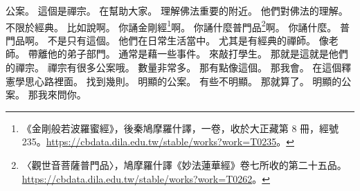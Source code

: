 \hypertarget{c01:cue:203}{}公案。
\hypertarget{c01:cue:204}{}這個是禪宗。
\hypertarget{c01:cue:205}{}在幫助大家。
\hypertarget{c01:cue:206}{}理解佛法重要的附近。
\hypertarget{c01:cue:207}{}他們對佛法的理解。
\hypertarget{c01:cue:208}{}不限於經典。
\hypertarget{c01:cue:209}{}比如說啊。
\hypertarget{c01:cue:210}{}你誦金剛經\footnote{《金剛般若波羅蜜經》，後秦鳩摩羅什譯，一卷，收於大正藏第 8 冊，經號 235。\url{https://cbdata.dila.edu.tw/stable/works?work=T0235}。}啊。
\hypertarget{c01:cue:211}{}你誦什麼普門品\footnote{〈觀世音菩薩普門品〉，鳩摩羅什譯《妙法蓮華經》卷七所收的第二十五品。\url{https://cbdata.dila.edu.tw/stable/works?work=T0262}。}啊。
\hypertarget{c01:cue:212}{}你誦什麼。
\hypertarget{c01:cue:213}{}普門品啊。
\hypertarget{c01:cue:214}{}不是只有這個。
\hypertarget{c01:cue:215}{}他們在日常生活當中。
\hypertarget{c01:cue:216}{}尤其是有經典的禪師。
\hypertarget{c01:cue:217}{}像老師。
\hypertarget{c01:cue:218}{}帶離他的弟子部門。
\hypertarget{c01:cue:219}{}通常是藉一些事件。
\hypertarget{c01:cue:220}{}來敲打學生。
\hypertarget{c01:cue:221}{}那就是這就是他們的禪宗。
\hypertarget{c01:cue:222}{}禪宗有很多公案哦。
\hypertarget{c01:cue:223}{}數量非常多。
\hypertarget{c01:cue:224}{}那有點像這個。
\hypertarget{c01:cue:225}{}那我會。
\hypertarget{c01:cue:226}{}在這個釋憲學思心路裡面。
\hypertarget{c01:cue:227}{}找到幾則。
\hypertarget{c01:cue:228}{}明顯的公案。
\hypertarget{c01:cue:229}{}有些不明顯。
\hypertarget{c01:cue:230}{}那就算了。
\hypertarget{c01:cue:231}{}明顯的公案。
\hypertarget{c01:cue:232}{}那我來問你。

